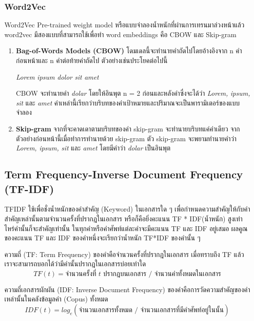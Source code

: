 \subsubsection{Word2Vec}
Word2Vec \cite{lukkiddd} Pre-trained weight model หรือแบบจำลองน้ำหนักที่ผ่านการเทรนมาล่วงหน้าแล้ว word2vec มีสองแบบที่สามารถใช้เพื่อทำ word embeddings คือ CBOW และ Skip-gram
\begin{enumerate}
  \item \textbf{Bag-of-Words Models (CBOW)} โดมเดลนี้จะทำนายคำถัดไปโดยอ้างอิงจาก n คำก่อนหน้าและ n คำต่อท้ายคำถัดไป ตัวอย่างเช่นประโยคต่อไปนี้ 
  
  \centerline{\emph{Lorem ipsum dolor sit amet}}
  
  CBOW จะทำนายคำ \emph{dolar} โดยให้อินพุต n = 2 ก่อนและหลังคำซึ่งจะได้ว่า \emph{Lorem, ipsum, sit} และ \emph{amet} คำเหล่านี้เรียกว่าบริบทของคำเป้าหมายและปริมาณจะเป็นพารามิเตอร์ของแบบจำลอง

  \item \textbf{Skip-gram} จากที่จะคาดเดาตามบริบทของคำ skip-gram จะทำนายบริบทแค่คำเดียว จากตัวอย่างก่อนหน้านี้เมื่อทำการทำนายด้วย skip-gram ตัว skip-gram จะพยามทำนายคำว่า \emph{Lorem, ipsum, sit} และ \emph{amet} โดยมีคำว่า \emph{dolar} เป็นอินพุต
\end{enumerate}

\subsection{Term Frequency-Inverse Document Frequency (TF-IDF)}
TFIDF \cite{cory} ใช้เพื่อชั่งน้ำหนักของคำสำคัญ (Keyword) ในเอกสารใด ๆ เพื่อกำหนดความสำคัญให้กับคำสำคัญเหล่านั้นตามจำนวนครั้งที่ปรากฎในเอกสาร หรือก็คือยิ่งคะแนน TF * IDF(น้ำหนัก) สูงเท่าไหร่คำนั้นก็จะสำคัญเท่านั้น ในทุกคำหรือคำศัพท์แต่ละคำจะมีคะแนน TF และ IDF อยู่เสมอ ผลคูณของคะแนน TF และ IDF ของคำหนึ่งจะเรียกว่าน้ำหนัก TF*IDF ของคำนั้น ๆ
\newline

ความถี่ (TF: Term Frequency) ของคำคือจำนวนครั้งที่ปรากฎในเอกสาร เมื่อทราบถึง TF แล้วเราจะสามารถบอกได้ว่ามีคำนั้นปรากฎในเอกสารบ่อยเท่าใด
\begin{equation}
  TF(t) = \text{จำนวนครั้งที่ } t \text{ ปรากฎบนเอกสาร } / \text{ จำนวนคำทั้งหมดในเอกสาร}
\end{equation}

ความถี่เอกสารผักผัน (IDF: Inverse Document Frequency) ของคำคือการวัดความสำคัญของคำเหล่านั้นในคลังข้อมูลคำ (Copus) ทั้งหมด
\begin{equation}
  IDF(t) = log_e (\text{จำนวนเอกสารทั้งหมด } / \text{ จำนวนเอกสารที่มีคำศัพท์อยู่ในนั้น})
\end{equation}

